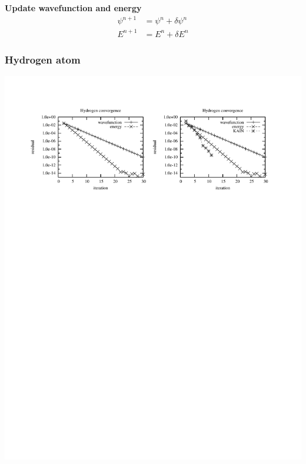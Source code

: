 \documentclass[mathserif, 10pt]{beamer}
\begin{document}
\begin{frame}
    \vspace{5mm}

    \textbf{Update wavefunction and energy}
    \begin{align}
	\nonumber
        \psi^{n+1}  &= \psi^n + \delta \psi^n\\
	\nonumber
        E^{n+1}     &= E^n + \delta E^n
    \end{align}
\end{frame}

\begin{frame}
    \frametitle{Hydrogen atom}
    \begin{center}
	\includegraphics[scale=1.0, clip, viewport = 300 550 560 740]{figures/h_convergence.pdf}
    \end{center}
\end{frame}
\end{document}
